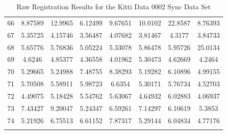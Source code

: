 \begin{center}
\begin{longtable}{cccccccc}
66 & 8.87589 & 12.9965 & 6.12499 & 9.67651 & 10.0102 & 22.8587 & 8.76393\\
67 & 5.35725 & 4.15746 & 3.56487 & 4.07682 & 3.81467 & 4.3177 & 3.84733\\
68 & 5.65776 & 5.76836 & 5.05224 & 5.33078 & 5.86478 & 5.95726 & 25.0134\\
69 & 4.6246 & 4.85377 & 4.36558 & 4.01962 & 5.30473 & 4.62669 & 4.2464\\
70 & 5.29665 & 5.24988 & 7.48755 & 8.38293 & 5.19282 & 6.10896 & 4.99155\\
71 & 5.70508 & 5.58911 & 5.98723 & 6.6354 & 5.30171 & 5.76734 & 4.52703\\
72 & 4.49075 & 5.18428 & 5.54762 & 5.63067 & 4.64932 & 6.02883 & 4.06937\\
73 & 7.43427 & 9.20047 & 5.24347 & 6.59261 & 7.14297 & 6.10619 & 5.3853\\
74 & 5.21926 & 6.75513 & 6.61152 & 7.87317 & 5.29144 & 6.04834 & 4.77176\\
\caption{Raw Registration Results for the Kitti Data 0002 Sync Data Set}
\label{tab:kittidata0002syncFULL}
\end{longtable}
\end{center} 



